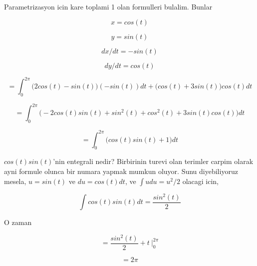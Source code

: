 \documentclass[12pt,fleqn]{article}
\begin{document}
Parametrizasyon icin kare toplami 1 olan formulleri bulalim. Bunlar

\[ x = cos(t) \]

\[ y = sin(t) \]

\[ dx/dt = -sin(t)\]

\[ dy/dt = cos(t) \]

\[ =
\int_0^{2\pi} \bigg( 2cos(t) - sin(t) \bigg)(-sin(t))dt + 
\bigg(cos(t) + 3sin(t)\bigg)cos(t) dt
 \]

\[ = 
\int_0^{2\pi} \bigg( 
-2cos(t)sin(t) + sin^2(t) + 
cos^2(t) + 3sin(t)cos(t)
\bigg) dt
 \]

\[ = 
\int_0^{2\pi} \bigg( 
cos(t)sin(t) + 1
\bigg) dt
 \]

$cos(t)sin(t)$'nin entegrali nedir? Birbirinin turevi olan terimler carpim
olarak ayni formule olunca bir numara yapmak mumkun oluyor. Sunu 
diyebiliyoruz mesela, $u=sin(t)$ ve $du=cos(t)dt$, ve $\int u du = u^2/2$
olacagi icin, 

\[ \int cos(t)sin(t)dt = \frac{sin^2(t)}{2} \]

O zaman 

\[ = \frac{sin^2(t)}{2} + t \ \bigg|_0^{2\pi}  \]

\[ =  2\pi \]
\end{document}
